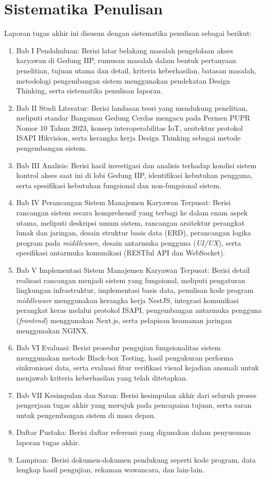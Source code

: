 \section{Sistematika Penulisan}
Laporan tugas akhir ini disusun dengan sistematika penulisan sebagai berikut:
\begin{enumerate}
    \item	Bab I Pendahuluan: Berisi latar belakang masalah pengelolaan akses karyawan di Gedung IIP, rumusan masalah dalam bentuk pertanyaan penelitian, tujuan utama dan detail, kriteria keberhasilan, batasan masalah, metodologi pengembangan sistem menggunakan pendekatan Design Thinking, serta sistematika penulisan laporan.
    \item   Bab II Studi Literatur: Berisi landasan teori yang mendukung penelitian, meliputi standar Bangunan Gedung Cerdas mengacu pada Permen PUPR Nomor 10 Tahun 2023, konsep interoperabilitas IoT, arsitektur protokol ISAPI Hikvision, serta kerangka kerja Design Thinking sebagai metode pengembangan sistem.
    \item	Bab III Analisis: Berisi hasil investigasi dan analisis terhadap kondisi sistem kontrol akses saat ini di lobi Gedung IIP, identifikasi kebutuhan pengguna, serta spesifikasi kebutuhan fungsional dan non-fungsional sistem.
    \item Bab IV Perancangan Sistem Manajemen Karyawan Terpusat: Berisi rancangan sistem secara komprehensif yang terbagi ke dalam enam aspek utama, meliputi deskripsi umum sistem, rancangan arsitektur perangkat lunak dan jaringan, desain struktur basis data (ERD), perancangan logika program pada \textit{middleware}, desain antarmuka pengguna (\textit{UI/UX}), serta spesifikasi antarmuka komunikasi (RESTful API dan WebSocket).
    \item Bab V Implementasi Sistem Manajemen Karyawan Terpusat: Berisi detail realisasi rancangan menjadi sistem yang fungsional, meliputi pengaturan lingkungan infrastruktur, implementasi basis data, penulisan kode program \textit{middleware} menggunakan kerangka kerja NestJS, integrasi komunikasi perangkat keras melalui protokol ISAPI, pengembangan antarmuka pengguna (\textit{frontend}) menggunakan Next.js, serta pelapisan keamanan jaringan menggunakan NGINX.
    \item	Bab VI Evaluasi: Berisi prosedur pengujian fungsionalitas sistem menggunakan metode Black-box Testing, hasil pengukuran performa sinkronisasi data, serta evaluasi fitur verifikasi visual kejadian anomali untuk menjawab kriteria keberhasilan yang telah ditetapkan.            
    \item   Bab VII Kesimpulan dan Saran: Berisi kesimpulan akhir dari seluruh proses pengerjaan tugas akhir yang merujuk pada pencapaian tujuan, serta saran untuk pengembangan sistem di masa depan.
    \item   Daftar Pustaka: Berisi daftar referensi yang digunakan dalam penyusunan laporan tugas akhir.
    \item   Lampiran: Berisi dokumen-dokumen pendukung seperti kode program, data lengkap hasil pengujian, rekaman wawancara, dan lain-lain. 
\end{enumerate}